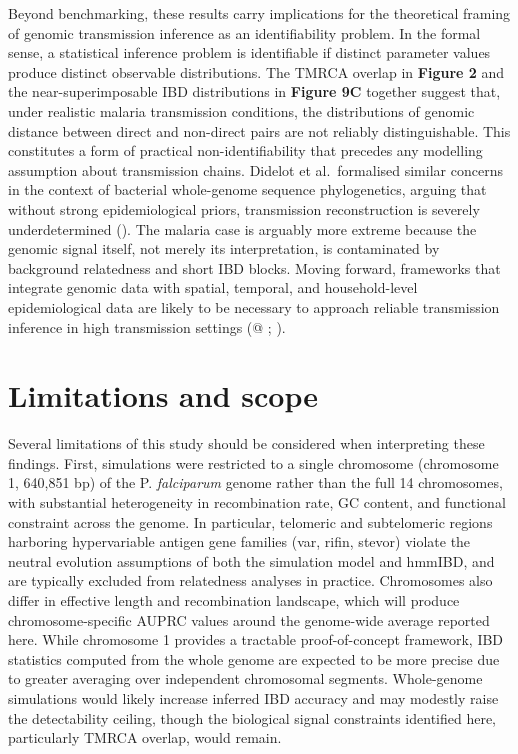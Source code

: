 \documentclass[
  11pt,
]{article}
\begin{document}
Beyond benchmarking, these results carry implications for the
theoretical framing of genomic transmission inference as an
identifiability problem. In the formal sense, a statistical inference
problem is identifiable if distinct parameter values produce distinct
observable distributions. The TMRCA overlap in \textbf{Figure 2} and the
near-superimposable IBD distributions in \textbf{Figure 9C} together
suggest that, under realistic malaria transmission conditions, the
distributions of genomic distance between direct and non-direct pairs
are not reliably distinguishable. This constitutes a form of practical
non-identifiability that precedes any modelling assumption about
transmission chains. Didelot et al.~formalised similar concerns in the
context of bacterial whole-genome sequence phylogenetics, arguing that
without strong epidemiological priors, transmission reconstruction is
severely underdetermined (). The malaria case is arguably more extreme because the
genomic signal itself, not merely its interpretation, is contaminated by
background relatedness and short IBD blocks. Moving forward, frameworks
that integrate genomic data with spatial, temporal, and household-level
epidemiological data are likely to be necessary to approach reliable
transmission inference in high transmission settings (@
;
).

\section{Limitations and scope}\label{limitations-and-scope}

Several limitations of this study should be considered when interpreting
these findings. First, simulations were restricted to a single
chromosome (chromosome 1, 640,851 bp) of the P. \emph{falciparum} genome
rather than the full 14 chromosomes, with substantial heterogeneity in
recombination rate, GC content, and functional constraint across the
genome. In particular, telomeric and subtelomeric regions harboring
hypervariable antigen gene families (var, rifin, stevor) violate the
neutral evolution assumptions of both the simulation model and hmmIBD,
and are typically excluded from relatedness analyses in practice.
Chromosomes also differ in effective length and recombination landscape,
which will produce chromosome-specific AUPRC values around the
genome-wide average reported here. While chromosome 1 provides a
tractable proof-of-concept framework, IBD statistics computed from the
whole genome are expected to be more precise due to greater averaging
over independent chromosomal segments. Whole-genome simulations would
likely increase inferred IBD accuracy and may modestly raise the
detectability ceiling, though the biological signal constraints
identified here, particularly TMRCA overlap, would remain.
\end{document}
